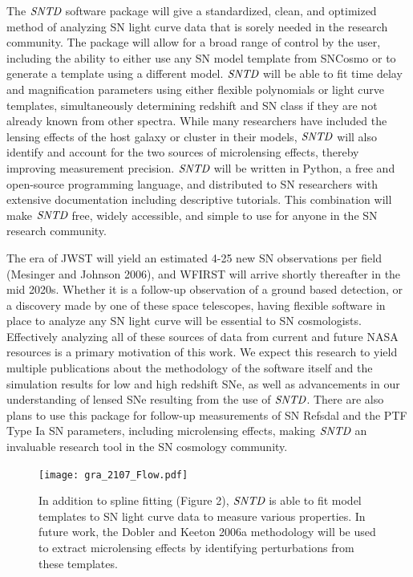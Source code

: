 The $\textit{SNTD}$ software package will give a standardized, clean, and optimized method of analyzing SN light curve data that is sorely needed in the research community. The package will allow for a broad range of control by the user, including the ability to either use any SN model template from SNCosmo or to generate a template using a different model. $\textit{SNTD}$ will be able to fit time delay and magnification parameters using either flexible polynomials or light curve templates, simultaneously determining redshift and SN class if they are not already known from other spectra. While many researchers have included the lensing effects of the host galaxy or cluster in their models, $\textit{SNTD}$ will also identify and account for the two sources of microlensing effects, thereby improving measurement precision. $\textit{SNTD}$ will be written in Python, a free and open-source programming language, and distributed to SN researchers with extensive documentation including descriptive tutorials. This combination will make $\textit{SNTD}$ free, widely accessible, and simple to use for anyone in the SN research community.		

The era of JWST will yield an estimated 4-25 new SN observations per field (Mesinger and Johnson 2006), and WFIRST will arrive shortly thereafter in the mid 2020s. Whether it is a follow-up observation of a ground based detection, or a discovery made by one of these space telescopes, having flexible software in place to analyze any SN light curve will be essential to SN cosmologists. Effectively analyzing all of these sources of data from current and future NASA resources is a primary motivation of this work. We expect this research to yield multiple publications about the methodology of the software itself and the simulation results for low and high redshift SNe, as well as advancements in our understanding of lensed SNe resulting from the use of $\textit{SNTD}$. There are also plans to use this package for follow-up measurements of SN Refsdal and the PTF Type Ia SN parameters, including microlensing effects, making $\textit{SNTD}$ an invaluable research tool in the SN cosmology community. 

\pagebreak

\begin{figure}[h]
\centering
\texttt{[image: gra\_2107\_Flow.pdf]}
\caption{In addition to spline fitting (Figure 2), $\textit{SNTD}$ is able to fit model templates to SN light curve data to measure various properties. In future work, the Dobler and Keeton 2006a methodology will be used to extract microlensing effects by identifying perturbations from these templates.}
\end{figure}


